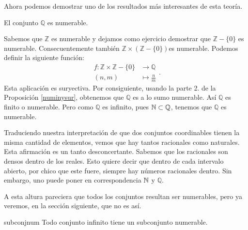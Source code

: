 Ahora podemos demostrar  uno de los resultados más interesantes
de esta teoría.
\begin{teorema}{} El conjunto $\mathbb{Q}$ es numerable.
\end{teorema}
\begin{demo} Sabemos que $\mathbb{Z}$ es numerable y dejamos como ejercicio demostrar que $\mathbb{Z}-\{0\}$ es numerable. Consecuentemente también  $\mathbb{Z}\times\left(\mathbb{Z}-\{0\}\right) $es numerable. Podemos
definir la siguiente función:
\[
\begin{split}
f:\mathbb{Z}\times\mathbb{Z}-\{0\}&\longrightarrow\mathbb{Q}\\
(n,m)&\longmapsto \frac{n}{m}
\end{split}
.\] Esta aplicación es suryectiva. Por consiguiente, usando la
parte 2. de la Proposición \vref{numinysur}, obtenemos que
$\mathbb{Q}$ es a lo sumo numerable. Así $\mathbb{Q}$ es
finito o numerable. Pero como $\mathbb{Q}$ es infinito, pues
$\mathbb{N}\subset\mathbb{Q}$, tenemos que $\mathbb{Q}$ es numerable. \end{demo}


Traduciendo nuestra interpretación de que dos conjuntos
coordinables tienen la misma cantidad de elementos, vemos que hay
tantos racionales como naturales. Esta afirmación es un tanto
desconcertante. Sabemos que los racionales son
densos dentro de los reales. Esto quiere decir que dentro de cada
intervalo abierto, por chico que este fuere, siempre hay números
racionales dentro. Sin embargo, uno puede poner en correspondencia
$\mathbb{N}$ y $\mathbb{Q}$.  

A esta altura pareciera que
todos los conjuntos resultan ser numerables, pero ya veremos, en
la sección siguiente, que no es así.


\begin{lema}{subconjnum} Todo conjunto infinito tiene un
subconjunto numerable.
\end{lema}

